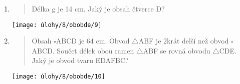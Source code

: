 \begin{enumerate}
\begin{minipage}[t]{\linewidth}
    \end{minipage}

    \item
    \begin{minipage}[t]{\linewidth}
        \begin{quote}
            Délka g je 14 cm.
            Jaký je obsah čtverce D?
        \end{quote}
        \centering
        \texttt{[image: úlohy/8/obobde/9]}

    \end{minipage}

    \item
    \begin{minipage}[t]{\linewidth}
        \begin{quote}
            Obsah $\square$ABCD je 64 cm.
            Obvod $\triangle$ABF je 2krát delší než obvod $\square$ABCD. Součet délek obou ramen $\triangle$ABF se rovná obvodu $\triangle$CDE. Jaký je obvod tvaru EDAFBC?
        \end{quote}
        \centering
        \texttt{[image: úlohy/8/obobde/10]}

    \end{minipage}
\end{enumerate}


\newpage

